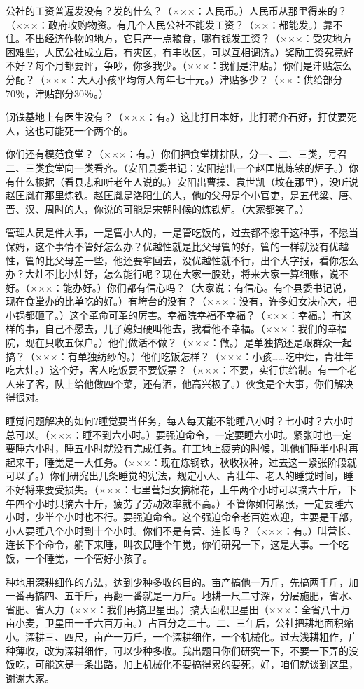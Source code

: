 公社的工资普遍发没有？发的什么？（×××：人民币。）人民币从那里得来的？（×××：政府收购物资。有几个人民公社不能发工资？（××：都能发。）靠不住。不出经济作物的地方，它只产一点粮食，哪有钱发工资？（×××：受灾地方困难些，人民公社成立后，有灾区，有丰收区，可以互相调济。）奖励工资究竟好不好？每个月都要评，争吵，你多我少。（×××：我们是津贴。）你们是津贴怎么分配？（×××：大人小孩平均每人每年七十元。）津贴多少？（××：供给部分70％，津贴部分30％。）

钢铁基地上有医生没有？（×××：有。）这比打日本好，比打蒋介石好，打仗要死人，这也可能死一个两个的。

你们还有模范食堂？（×××：有。）你们把食堂排排队，分一、二、三类，号召二、三类食堂向一类看齐。（安阳县委书记：安阳挖出一个赵匡胤炼铁的炉子。）你有什么根据（看县志和听老年人说的。）安阳出曹操、袁世凯（坟在那里），没听说赵匡胤在那里炼铁。赵匡胤是洛阳生的人，他的父母是个小官吏，是五代梁、唐、晋、汉、周时的人，你说的可能是宋朝时候的炼铁炉。（大家都笑了。）

管理人员是件大事，一是管小人的，一是管吃饭的，过去都不愿干这种事，不愿当保姆，这个事情不管好怎么办？优越性就是比父母管的好，管的一样就没有优越性，管的比父母差一些，他还要拿回去，没优越性就不行，出个大字报，看你怎么办？大灶不比小灶好，怎么能行呢？现在大家一股劲，将来大家一算细账，说不好。（×××：能办好。）你们都有信心吗？（大家说：有信心。有个县委书记说，现在食堂办的比单吃的好。）有垮台的没有？（×××：没有，许多妇女决心大，把小锅都砸了。）这个革命可革的厉害。幸福院幸福不幸福？（×××：幸福。）有这样的事，自己不愿去，儿子媳妇硬叫他去，我看他不幸福。（×××：我们的幸福院，现在只收五保户。）他们做活不做？（×××：做。）是单独搞还是跟群众一起搞？（×××：有单独纺纱的。）他们吃饭怎样？（×××：小孩……吃中灶，青壮年吃大灶。）这个好，客人吃饭要不要饭票？（×××：不要，实行供给制。有一个老人来了客，队上给他做四个菜，还有酒，他高兴极了。）伙食是个大事，你们解决得很对。

睡觉问题解决的如何?睡觉要当任务，每人每天能不能睡八小时？七小时？六小时总可以。（×××：睡不到六小时。）要强迫命令，一定要睡六小时。紧张时也一定要睡六小时，睡五小时就没有完成任务。在工地上疲劳的时候，叫他们睡半小时再起来干，睡觉是一大任务。（×××：现在炼钢铁，秋收秋种，过去这一紧张阶段就可以了。）你们研究出几条睡觉的宪法，规定小人、青壮年、老人的睡觉时间，睡不好将来要受损失。（×××：七里营妇女摘棉花，上午两个小时可以摘六十斤，下午四个小时只摘六十斤，疲劳了劳动效率就不高。）不管你如何紧张，一定要睡六小时，少半个小时也不行。要强迫命令。这个强迫命令老百姓欢迎，主要是干部，小人要睡八个小时到十个小时。你们不是有营、连长吗？（×××：有。）叫营长、连长下个命令，躺下来睡，叫农民睡个午觉，你们研究一下，这是大事。一个吃饭，一个睡觉，一个管好小孩子。

种地用深耕细作的方法，达到少种多收的目的。亩产搞他一万斤，先搞两千斤，加一番再搞四、五千斤，再翻一番就是一万斤。地耕一尺二寸深，分层施肥，省水、省肥、省人力（×××：我们再搞卫星田。）搞大面积卫星田（×××：全省八十万亩小麦，卫星田一千六百万亩。）占百分之二十。二、三年后，公社把耕地面积缩小。深耕三、四尺，亩产一万斤，一个深耕细作，一个机械化。过去浅耕粗作，广种薄收，改为深耕细作，可以少种多收。我出题目你们研究一下，不要一下弄的没饭吃，可能这是一条出路，加上机械化不要搞得累的要死，好，咱们就谈到这里，谢谢大家。


